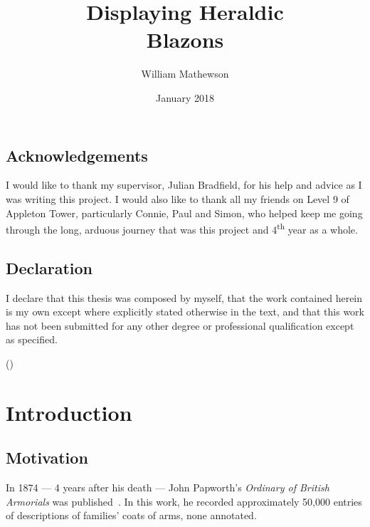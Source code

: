 \documentclass[nobib, a4paper, twoside, justified]{tufte-book}
\title{Displaying Heraldic\\Blazons}
\author{William Mathewson}
\date{January 2018}
\begin{document}
\frontmatter

\maketitlepage{}


\begin{publicationmeta}
  \section*{Acknowledgements}
  I would like to thank my supervisor, Julian Bradfield, for his help and advice as I was writing
  this project. I would also like to thank all my friends on Level 9 of Appleton Tower,
  particularly Connie, Paul and Simon, who helped keep me going through the long, arduous journey
  that was this project and 4\textsuperscript{th} year as a whole.

  \section*{Declaration}
  I declare that this thesis was composed by myself,
  that the work contained herein is my own
  except where explicitly stated otherwise in the text,
  and that this work has not been submitted for any other degree or
  professional qualification except as specified.\par
  ({\textit{\thanklessauthor}})
\end{publicationmeta}

\tableofcontents


\mainmatter%

\chapter{Introduction}%
\label{cha:introduction}

\section{Motivation}\label{sec:motivation}

In 1874 --- 4 years after his death --- John Papworth's \textit{Ordinary of British Armorials} was
published~\autocite{collins_1942}. In this work, he recorded approximately 50,000 entries of
descriptions of families' coats of arms, none annotated.
\end{document}
